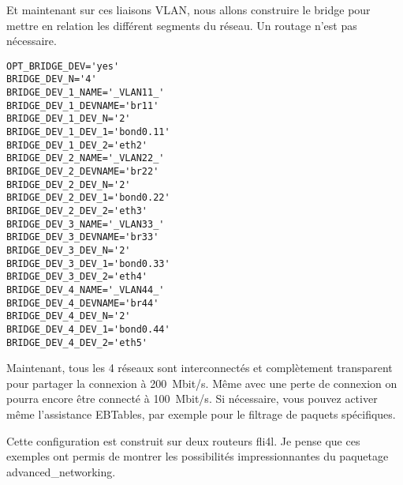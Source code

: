 Et maintenant sur ces liaisons VLAN, nous allons construire le bridge
pour mettre en relation les différent segments du réseau. Un routage
n'est pas nécessaire.

\begin{example}
\begin{verbatim}
OPT_BRIDGE_DEV='yes'
BRIDGE_DEV_N='4'
BRIDGE_DEV_1_NAME='_VLAN11_'
BRIDGE_DEV_1_DEVNAME='br11'
BRIDGE_DEV_1_DEV_N='2'
BRIDGE_DEV_1_DEV_1='bond0.11'
BRIDGE_DEV_1_DEV_2='eth2'
BRIDGE_DEV_2_NAME='_VLAN22_'
BRIDGE_DEV_2_DEVNAME='br22'
BRIDGE_DEV_2_DEV_N='2'
BRIDGE_DEV_2_DEV_1='bond0.22'
BRIDGE_DEV_2_DEV_2='eth3'
BRIDGE_DEV_3_NAME='_VLAN33_'
BRIDGE_DEV_3_DEVNAME='br33'
BRIDGE_DEV_3_DEV_N='2'
BRIDGE_DEV_3_DEV_1='bond0.33'
BRIDGE_DEV_3_DEV_2='eth4'
BRIDGE_DEV_4_NAME='_VLAN44_'
BRIDGE_DEV_4_DEVNAME='br44'
BRIDGE_DEV_4_DEV_N='2'
BRIDGE_DEV_4_DEV_1='bond0.44'
BRIDGE_DEV_4_DEV_2='eth5'
\end{verbatim}
\end{example}

Maintenant, tous les 4 réseaux sont interconnectés et complètement
transparent pour partager la connexion à 200~Mbit/s. Même avec une
perte de connexion on pourra encore être connecté à 100~Mbit/s.
Si nécessaire, vous pouvez activer même l'assistance EBTables,
par exemple pour le filtrage de paquets spécifiques.

Cette configuration est construit sur deux routeurs fli4l. Je pense
que ces exemples ont permis de montrer les possibilités impressionnantes
du paquetage advanced\_networking.
